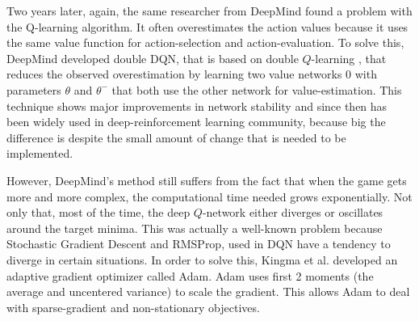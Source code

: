             Two years later, again, the same researcher from DeepMind found a problem with the Q-learning algorithm. It often overestimates the action values because it uses the same value function for action-selection and action-evaluation. To solve this, DeepMind developed double DQN, that is based on double $Q$-learning \cite{DBLP:journals/corr/HasseltGS15}, that reduces the observed overestimation by learning two value networks 0 with parameters $\theta$ and $\theta^-$ that both use the other network for value-estimation. This technique shows major improvements in network stability and since then has been widely used in deep-reinforcement learning community, because big the difference is despite the small amount of change that is needed to be implemented.
            
            However, DeepMind's method still suffers from the fact that when the game gets more and more complex, the computational time needed grows exponentially. Not only that, most of the time, the deep $Q$-network either diverges or oscillates around the target minima. This was actually a well-known problem because Stochastic Gradient Descent and RMSProp, used in DQN have a tendency to diverge in certain situations. In order to solve this, Kingma et al. \cite{DBLP:journals/corr/KingmaB14} developed an adaptive gradient optimizer called Adam. Adam uses first 2 moments (the average and uncentered variance) to scale the gradient. This allows Adam to deal with sparse-gradient and non-stationary objectives.
            
